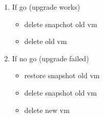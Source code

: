 \begin{enumerate}
    \item If go (upgrade works)
    \begin{itemize}
        \item delete snapchot old vm
        \item delete old vm
    \end{itemize}
    \item If no go (upgrade failed)
    \begin{itemize}
        \item restore snapshot old vm
        \item delete snapshot old vm
        \item delete new vm
    \end{itemize}
\end{enumerate}